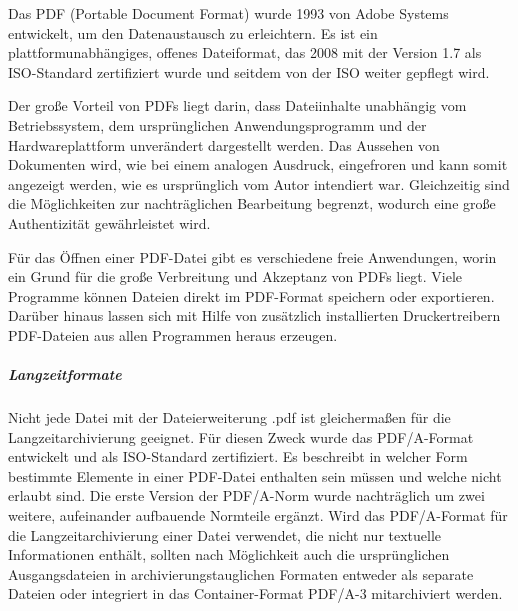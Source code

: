 Das PDF (Portable Document Format) wurde 1993 von Adobe Systems entwickelt, um den Datenaustausch zu erleichtern. Es ist ein plattformunabhängiges, offenes Dateiformat, das 2008 mit der Version 1.7 als ISO-Standard zertifiziert wurde und seitdem von der ISO weiter gepflegt wird.  

Der große Vorteil von PDFs liegt darin, dass Dateiinhalte unabhängig vom Betriebssystem, dem ursprünglichen Anwendungsprogramm und der Hardwareplattform unverändert dargestellt werden. Das Aussehen von Dokumenten wird, wie bei einem analogen Ausdruck, eingefroren und kann somit angezeigt werden, wie es ursprünglich vom Autor intendiert war.  Gleichzeitig sind die Möglichkeiten zur nachträglichen Bearbeitung begrenzt, wodurch eine große Authentizität gewährleistet wird.

Für das Öffnen einer PDF-Datei gibt es verschiedene freie Anwendungen, worin ein Grund für die große Verbreitung und Akzeptanz von PDFs liegt. Viele Programme können Dateien direkt im PDF-Format speichern oder exportieren. Darüber hinaus lassen sich mit Hilfe von zusätzlich installierten Druckertreibern PDF-Dateien aus allen Programmen heraus erzeugen.

\subparagraph{Langzeitformate} Nicht jede Datei mit der Dateierweiterung .pdf  ist gleichermaßen für die Langzeitarchivierung geeignet. Für diesen Zweck  wurde das PDF/A-Format entwickelt und als ISO-Standard zertifiziert. Es beschreibt in welcher Form bestimmte Elemente in einer PDF-Datei enthalten sein müssen und welche nicht erlaubt sind. Die erste Version der PDF/A-Norm wurde nachträglich um zwei weitere, aufeinander aufbauende Normteile ergänzt. Wird das PDF/A-Format für die Langzeitarchivierung einer Datei verwendet, die nicht nur textuelle Informationen enthält, sollten nach Möglichkeit auch die ursprünglichen Ausgangsdateien in archivierungstauglichen Formaten entweder als separate Dateien oder integriert in das Container-Format PDF/A-3 mitarchiviert werden.

